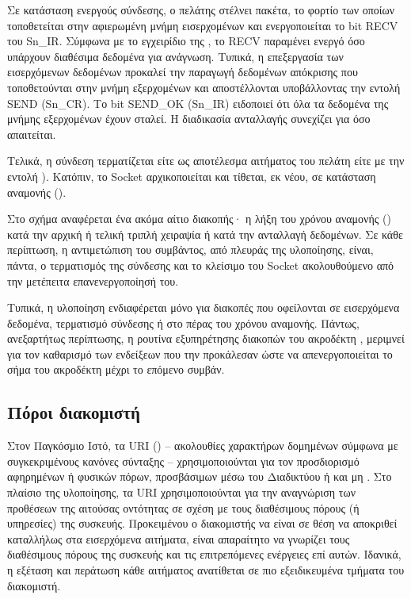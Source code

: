 Σε κατάσταση ενεργούς σύνδεσης, ο πελάτης στέλνει πακέτα, το φορτίο των οποίων
τοποθετείται στην αφιερωμένη μνήμη εισερχομένων και ενεργοποιείται το bit RECV
του Sn\_IR. Σύμφωνα με το εγχειρίδιο της \textcite[28]{wiz11:w5100}, το RECV
παραμένει ενεργό όσο υπάρχουν διαθέσιμα δεδομένα για ανάγνωση. Τυπικά, η
επεξεργασία των εισερχόμενων δεδομένων προκαλεί την παραγωγή δεδομένων απόκρισης
που τοποθετούνται στην μνήμη εξερχομένων και αποστέλλονται υποβάλλοντας την
εντολή SEND (Sn\_CR). Το bit SEND\_OK (Sn\_IR) ειδοποιεί ότι όλα τα δεδομένα της
μνήμης εξερχομένων έχουν σταλεί. Η διαδικασία ανταλλαγής συνεχίζει για όσο
απαιτείται.

Τελικά, η σύνδεση τερματίζεται είτε ως αποτέλεσμα αιτήματος του πελάτη είτε με
την εντολή ). Κατόπιν, το Socket αρχικοποιείται και τίθεται, εκ νέου,
σε κατάσταση αναμονής ().

Στο σχήμα αναφέρεται ένα ακόμα αίτιο διακοπής· η λήξη του χρόνου αναμονής
() κατά την αρχική ή τελική τριπλή χειραψία ή κατά την ανταλλαγή
δεδομένων. Σε κάθε περίπτωση, η αντιμετώπιση του συμβάντος, από πλευράς της
υλοποίησης, είναι, πάντα, ο τερματισμός της σύνδεσης και το κλείσιμο του Socket
ακολουθούμενο από την μετέπειτα επανενεργοποίησή του.

Τυπικά, η υλοποίηση ενδιαφέρεται μόνο για διακοπές που οφείλονται σε εισερχόμενα
δεδομένα, τερματισμό σύνδεσης ή στο πέρας του χρόνου αναμονής. Πάντως,
ανεξαρτήτως περίπτωσης, η ρουτίνα εξυπηρέτησης διακοπών του ακροδέκτη
, μεριμνεί για τον καθαρισμό των ενδείξεων που την προκάλεσαν ώστε να
απενεργοποιείται το σήμα του ακροδέκτη μέχρι το επόμενο συμβάν.


\subsection{Πόροι διακομιστή}

Στον Παγκόσμιο Ιστό, τα URI () -- ακολουθίες
χαρακτήρων δομημένων σύμφωνα με συγκεκριμένους κανόνες σύνταξης --
χρησιμοποιούνται για τον προσδιορισμό αφηρημένων ή φυσικών πόρων, προσβάσιμων
μέσω του Διαδικτύου ή και μη \parencite[1,5]{rfc3986}.
Στο πλαίσιο της υλοποίησης, τα URI χρησιμοποιούνται για την αναγνώριση των
προθέσεων της αιτούσας οντότητας σε σχέση με τους διαθέσιμους πόρους (ή
υπηρεσίες) της συσκευής. Προκειμένου ο διακομιστής να είναι σε θέση να αποκριθεί
καταλλήλως στα εισερχόμενα αιτήματα, είναι απαραίτητο να γνωρίζει τους
διαθέσιμους πόρους της συσκευής και τις επιτρεπόμενες ενέργειες επί αυτών.
Ιδανικά, η εξέταση και περάτωση κάθε αιτήματος ανατίθεται σε πιο εξειδικευμένα
τμήματα του διακομιστή.


